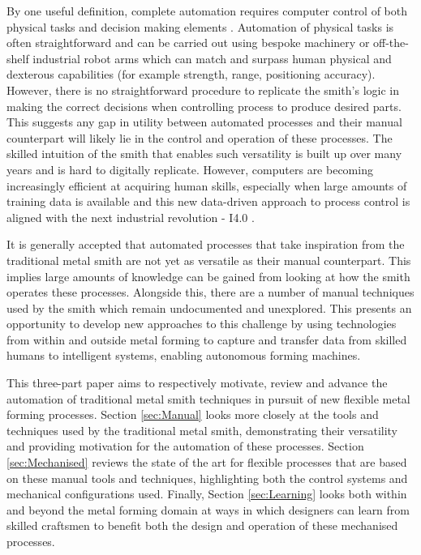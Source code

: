By one useful definition, complete automation requires computer control of both physical tasks and decision making elements \citep{Frohm2008LevelsManufacturing}. Automation of physical tasks is often straightforward and can be carried out using bespoke machinery or off-the-shelf industrial robot arms which can match and surpass human physical and dexterous capabilities (for example strength, range, positioning accuracy). However, there is no straightforward procedure to replicate the smith's logic in making the correct decisions when controlling process to produce desired parts. This suggests any gap in utility between automated processes and their manual counterpart will likely lie in the control and operation of these processes. The skilled intuition of the smith that enables such versatility is built up over many years and is hard to digitally replicate. However, computers are becoming increasingly efficient at acquiring human skills, especially when large amounts of training data is available \citep{Ford2016TheUnemployment} and this new data-driven approach to process control is aligned with the next industrial revolution - I4.0 \citep{Zhong2017IntelligentReview}. 

It is generally accepted that automated processes that take inspiration from the traditional metal smith are not yet as versatile as their manual counterpart.  This implies large amounts of knowledge can be gained from looking at how the smith operates these processes. Alongside this, there are a number of manual techniques used by the smith which remain undocumented and unexplored. This presents an opportunity to develop new approaches to this challenge by using technologies from within and outside metal forming to capture and transfer data from skilled humans to intelligent systems, enabling autonomous forming machines.

This three-part paper aims to respectively motivate, review and advance the automation of traditional metal smith techniques in pursuit of new flexible metal forming processes. Section \ref{sec:Manual} looks more closely at the tools and techniques used by the traditional metal smith, demonstrating their versatility and providing motivation for the automation of these processes. Section \ref{sec:Mechanised} reviews the state of the art for flexible processes that are based on these manual tools and techniques, highlighting both the control systems and mechanical configurations used. Finally, Section \ref{sec:Learning} looks both within and beyond the metal forming domain at ways in which designers can learn from skilled craftsmen to benefit both the design and operation of these mechanised processes.


